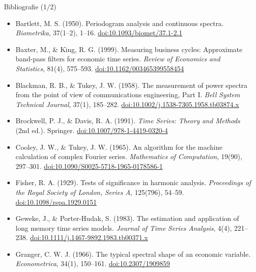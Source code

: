 \begin{frame}{Bibliografie (1/2)}
\itemsize{\scriptsize}
\begin{itemize}
    \item Bartlett, M. S. (1950). Periodogram analysis and continuous spectra. \textit{Biometrika}, 37(1--2), 1--16. \href{https://doi.org/10.1093/biomet/37.1-2.1}{doi:10.1093/biomet/37.1-2.1}
    \item Baxter, M., \& King, R. G. (1999). Measuring business cycles: Approximate band-pass filters for economic time series. \textit{Review of Economics and Statistics}, 81(4), 575--593. \href{https://doi.org/10.1162/003465399558454}{doi:10.1162/003465399558454}
    \item Blackman, R. B., \& Tukey, J. W. (1958). The measurement of power spectra from the point of view of communications engineering, Part I. \textit{Bell System Technical Journal}, 37(1), 185--282. \href{https://doi.org/10.1002/j.1538-7305.1958.tb03874.x}{doi:10.1002/j.1538-7305.1958.tb03874.x}
    \item Brockwell, P. J., \& Davis, R. A. (1991). \textit{Time Series: Theory and Methods} (2nd ed.). Springer. \href{https://doi.org/10.1007/978-1-4419-0320-4}{doi:10.1007/978-1-4419-0320-4}
    \item Cooley, J. W., \& Tukey, J. W. (1965). An algorithm for the machine calculation of complex Fourier series. \textit{Mathematics of Computation}, 19(90), 297--301. \href{https://doi.org/10.1090/S0025-5718-1965-0178586-1}{doi:10.1090/S0025-5718-1965-0178586-1}
    \item Fisher, R. A. (1929). Tests of significance in harmonic analysis. \textit{Proceedings of the Royal Society of London, Series A}, 125(796), 54--59. \href{https://doi.org/10.1098/rspa.1929.0151}{doi:10.1098/rspa.1929.0151}
    \item Geweke, J., \& Porter-Hudak, S. (1983). The estimation and application of long memory time series models. \textit{Journal of Time Series Analysis}, 4(4), 221--238. \href{https://doi.org/10.1111/j.1467-9892.1983.tb00371.x}{doi:10.1111/j.1467-9892.1983.tb00371.x}
    \item Granger, C. W. J. (1966). The typical spectral shape of an economic variable. \textit{Econometrica}, 34(1), 150--161. \href{https://doi.org/10.2307/1909859}{doi:10.2307/1909859}
\end{itemize}
\end{frame}

